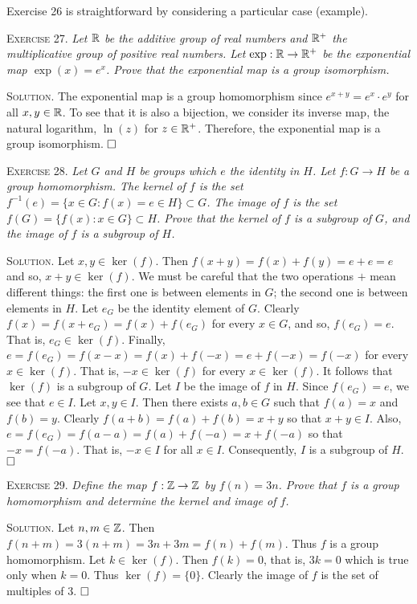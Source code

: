 \documentclass[11pt, leqno]{article}
\newcommand{\done}{\ensuremath{\hfill\square}}
\begin{document}
Exercise 26 is straightforward by considering a particular case (example).

\textsc{Exercise 27}. \emph{Let $\mathbb{R}$ be the additive group of real numbers and $\mathbb{R}^+$ the multiplicative group of positive real numbers. Let $\exp: \mathbb{R} \to \mathbb{R}^+$ be the exponential map $\exp(x) = e^x$. Prove that the exponential map is a group isomorphism.}

\textsc{Solution}. The exponential map is a group homomorphism since $e^{x+y}=e^x\cdot e^y$ for all $x,y \in \mathbb{R}$. To see that it is also a bijection, we consider its inverse map, the natural logarithm, $\ln(z)$ for $z\in\mathbb{R}^+$. Therefore, the exponential map is a group isomorphism. \done

\textsc{Exercise 28}. \emph{Let $G$ and $H$ be groups which $e$ the identity in $H$. Let $f:G\to H$ be a group homomorphism. The kernel of $f$ is the set $f^{-1}(e) = \{x\in G : f(x) = e \in H \} \subset G$. The image of $f$ is the set $f(G) = \{f(x) : x\in G\} \subset H$. Prove that the kernel of $f$ is a subgroup of $G$, and the image of $f$ is a subgroup of $H$.}

\textsc{Solution}. Let $x,y\in \ker(f)$. Then $f(x+y) = f(x) + f(y) = e + e = e$ and so, $x+y \in \ker(f)$. We must be careful that the two operations $+$ mean different things: the first one is between elements in $G$; the second one is between elements in $H$. Let $e_G$ be the identity element of $G$. Clearly $f(x) = f(x + e_G) = f(x) + f(e_G)$ for every $x \in G$, and so, $f(e_G) = e$. That is, $e_G \in \ker(f)$. Finally, $e = f(e_G) = f(x - x) = f(x) + f(-x) = e + f(-x) = f(-x)$ for every $x\in \ker(f)$. That is, $-x\in \ker(f)$ for every $x\in \ker(f)$. It follows that $\ker(f)$ is a subgroup of $G$. Let $I$ be the image of $f$ in $H$. Since $f(e_G) = e$, we see that $e\in I$. Let $x, y \in I$. Then there exists $a, b \in G$ such that $f(a) = x$ and $f(b) = y$. Clearly $f(a + b) = f(a) + f(b) = x + y$ so that $x+y \in I$. Also, $e = f(e_G) = f(a - a) = f(a) + f(-a) = x + f(-a)$ so that $-x = f(-a)$. That is, $-x \in I$ for all $x\in I$. Consequently, $I$ is a subgroup of $H$. \done

\textsc{Exercise 29}. \emph{Define the map $f: \mathbb{Z} \to \mathbb{Z}$ by $f(n)=3n$. Prove that $f$ is a group homomorphism and determine the kernel and image of $f$.}

\textsc{Solution}. Let $n,m \in \mathbb{Z}$. Then $f(n+m) = 3(n+m) = 3n + 3m = f(n) + f(m)$. Thus $f$ is a group homomorphism. Let $k\in \ker(f)$. Then $f(k) = 0$, that is, $3k = 0$ which is true only when $k=0$. Thus $\ker(f) = \{0\}$. Clearly the image of $f$ is the set of multiples of $3$. \done
\end{document}
